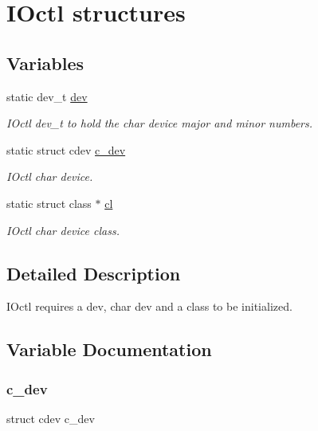 \hypertarget{group__IOctl__devices}{}\section{I\+Octl structures}
\label{group__IOctl__devices}
\subsection*{Variables}
\begin{DoxyCompactItemize}
\item 
static dev\+\_\+t \hyperlink{group__IOctl__devices_ga8910285a0352a5c710e65ec9ecbe32a1}{dev}
\begin{DoxyCompactList}\small\item\em I\+Octl dev\+\_\+t to hold the char device major and minor numbers. \end{DoxyCompactList}\item 
static struct cdev \hyperlink{group__IOctl__devices_ga68348f2a0fef7b6b04b3967775413977}{c\+\_\+dev}
\begin{DoxyCompactList}\small\item\em I\+Octl char device. \end{DoxyCompactList}\item 
static struct class $\ast$ \hyperlink{group__IOctl__devices_ga9baf21cac3b4034ca9c89bce7d82185b}{cl}
\begin{DoxyCompactList}\small\item\em I\+Octl char device class. \end{DoxyCompactList}\end{DoxyCompactItemize}


\subsection{Detailed Description}
I\+Octl requires a dev, char dev and a class to be initialized. 

\subsection{Variable Documentation}
\mbox{\label{group__IOctl__devices_ga68348f2a0fef7b6b04b3967775413977}} 
\subsubsection{\texorpdfstring{c\+\_\+dev}{c\_dev}}
{\footnotesize\ttfamily struct cdev c\+\_\+dev\hspace{0.3cm}{\ttfamily [static]}}



